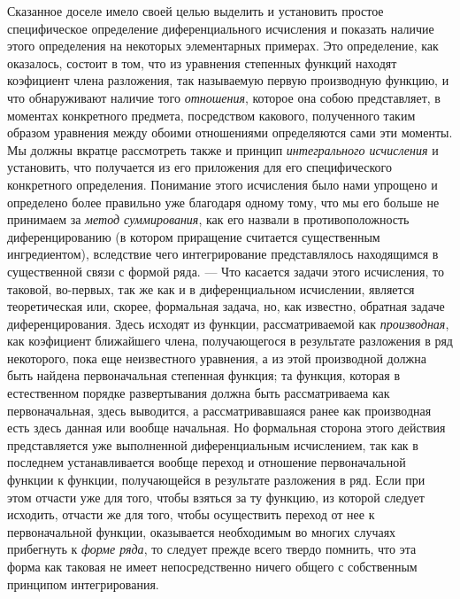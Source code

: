 {Сказанное доселе имело своей целью выделить и установить простое
специфическое определение диференциального исчисления и показать наличие
этого определения на некоторых элементарных примерах. Это определение, как
оказалось, состоит в том, что из уравнения степенных функций находят
коэфициент члена разложения, так называемую первую производную функцию, и
что обнаруживают наличие того {\em отношения}, которое
она собою представляет, в моментах конкретного предмета, посредством
какового, полученного таким образом уравнения между обоими отношениями
определяются сами эти моменты. Мы должны вкратце рассмотреть также и
принцип {\em интегрального исчисления} и установить,
что получается из его приложения для его специфического конкретного
определения. Понимание этого исчисления было нами упрощено и определено
более правильно уже благодаря одному тому, что мы его больше не принимаем
за {\em метод суммирования}, как его назвали в
противоположность диференцированию (в котором приращение считается
существенным ингредиентом), вследствие чего интегрирование представлялось
находящимся в существенной связи с формой ряда. — Что касается задачи этого
исчисления, то таковой, во-первых, так же как и в диференциальном
исчислении, является теоретическая или, скорее, формальная задача, но, как
известно, обратная задаче диференцирования. Здесь исходят из функции,
рассматриваемой как {\em производная}, как коэфициент
ближайшего члена, получающегося в результате разложения в ряд некоторого,
пока еще неизвестного уравнения, а из этой производной должна быть найдена
первоначальная степенная функция; та функция, которая в естественном
порядке развертывания должна быть рассматриваема как первоначальная, здесь
выводится, а рассматривавшаяся ранее как производная есть здесь данная или
вообще начальная. Но формальная сторона этого действия представляется уже
выполненной диференциальным исчислением, так как в последнем
устанавливается вообще переход и отношение первоначальной функции к
функции, получающейся в результате разложения в ряд. Если при этом отчасти
уже для того, чтобы взяться за ту функцию, из которой следует исходить,
отчасти же для того, чтобы осуществить переход от нее к первоначальной
функции, оказывается необходимым во многих случаях прибегнуть к
{\em форме ряда}, то следует прежде всего твердо
помнить, что эта форма как таковая не имеет непосредственно ничего общего с
собственным принципом интегрирования.

}
